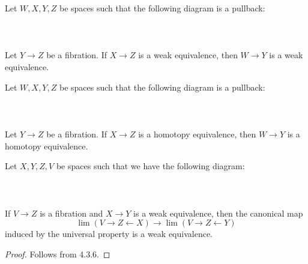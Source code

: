 \documentclass[a4paper]{article}
\begin{document}
\begin{prp}{}{} Let $W,X,Y,Z$ be spaces such that the following diagram is a pullback: \\~\\
\\~\\
Let $Y\to Z$ be a fibration. If $X\to Z$ is a weak equivalence, then $W\to Y$ is a weak equivalence. 
\end{prp}

\begin{prp}{}{} Let $W,X,Y,Z$ be spaces such that the following diagram is a pullback: \\~\\
\\~\\
Let $Y\to Z$ be a fibration. If $X\to Z$ is a homotopy equivalence, then $W\to Y$ is a homotopy equivalence. 
\end{prp}

\begin{prp}{}{} Let $X,Y,Z,V$ be spaces such that we have the following diagram: \\~\\
\\~\\
If $V\to Z$ is a fibration and $X\to Y$ is a weak equivalence, then the canonical map $$\lim(V\rightarrow Z\leftarrow X)\to\lim(V\rightarrow Z\leftarrow Y)$$ induced by the universal property is a weak equivalence. \tcbline
\begin{proof}
Follows from 4.3.6. 
\end{proof}
\end{prp}
\end{document}
